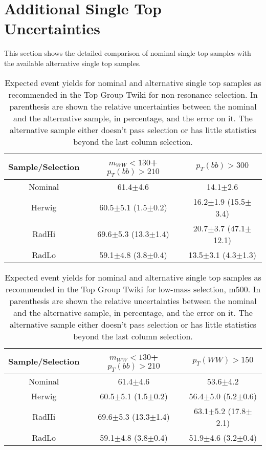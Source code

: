 \section {Additional Single Top Uncertainties}
This section shows the detailed comparison of nominal single top samples with the available alternative single top samples. 

\begin{table}
\caption{Expected event yields for nominal and alternative single top samples as recommended in the Top Group Twiki for non-resonance selection. In parenthesis are shown the relative uncertainties between the nominal and the alternative sample, in percentage, and the error on it. The alternative sample either doesn't pass selection or has little statistics beyond the last column selection.} 
\begin{tabular}{c|c|c|}
Sample/Selection & $m_{WW}<130$+$p_{T}(bb)>210$  		& $p_{T}(bb)>300$ \\
\hline
Nominal  		& 61.4$\pm$4.6 						& 14.1$\pm$2.6\\
\hline
Herwig     		& 60.5$\pm$5.1 (1.5$\pm$0.2)				& 16.2$\pm$1.9  (15.5$\pm$3.4) \\
 \hline
 RadHi       & 69.6$\pm$5.3 (13.3$\pm$1.4) 			& 20.7$\pm$3.7 (47.1$\pm$12.1) \\
 \hline
 RadLo	& 59.1$\pm$4.8 (3.8$\pm$0.4) 				& 13.5$\pm$3.1 (4.3$\pm$1.3)  \\
 \hline
\hline
\end{tabular}
\end{table}


\begin{table}
\caption{Expected event yields for nominal and alternative single top samples as recommended in the Top Group Twiki for low-mass selection, m500. In parenthesis are shown the relative uncertainties between the nominal and the alternative sample, in percentage, and the error on it. The alternative sample either doesn't pass selection or has little statistics beyond the last column selection.} 
\begin{tabular}{c|c|c|}
Sample/Selection & $m_{WW}<130$+$p_{T}(bb)>210$  		& $p_{T}(WW)>150$ \\
\hline
Nominal  		& 61.4$\pm$4.6 						& 53.6$\pm$4.2\\
\hline
Herwig     		& 60.5$\pm$5.1 (1.5$\pm$0.2)				& 56.4$\pm$5.0  (5.2$\pm$0.6) \\
 \hline
 RadHi       & 69.6$\pm$5.3 (13.3$\pm$1.4) 				& 63.1$\pm$5.2 (17.8$\pm$2.1) \\
 \hline
 RadLo	& 59.1$\pm$4.8 (3.8$\pm$0.4) 				& 51.9$\pm$4.6 (3.2$\pm$0.4)  \\
 \hline
\hline
\end{tabular}
\end{table}

